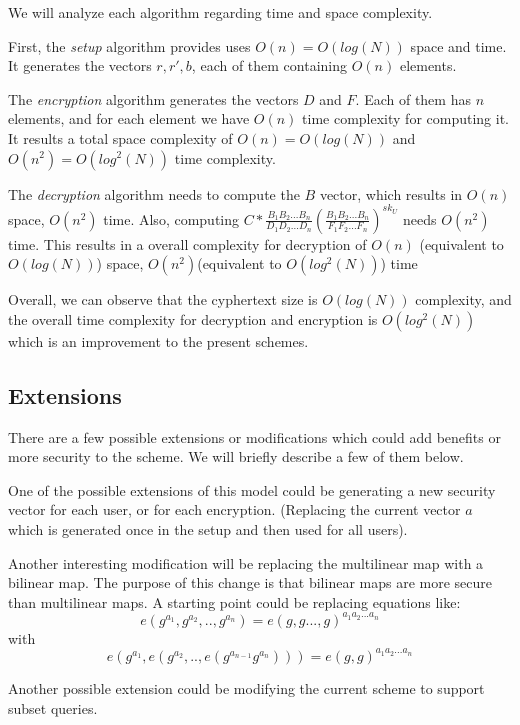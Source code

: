 \documentclass[a4paper, 12pt, oneside]{article}
\begin{document}
We will analyze each algorithm regarding time and space complexity.



First, the \textit{setup} algorithm provides uses $O(n) = O(log(N))$ space and time. It generates the vectors $r, r', b$, each of them containing $O(n)$ elements.

\bigskip
The \textit{encryption} algorithm generates the vectors $D$ and $F$. Each of them has $n$ elements, and for each element we have $O(n)$ time complexity for computing it. It results a total space complexity of $O(n) = O(log(N))$ and $O(n^2) = O(log^2(N))$ time complexity.

\bigskip
The \textit{decryption} algorithm needs to compute the $B$ vector, which results in $O(n)$ space, $O(n^2)$ time. Also, computing $C*\frac{B_1B_2...B_n}{D_1D_2...D_n}(\frac{B_1B_2...B_n}{F_1F_2...F_n})^{sk_U}$ needs $O(n^2)$ time. This results in a overall complexity for decryption of $O(n)$ (equivalent to $O(log(N))$) space, $O(n^2)$(equivalent to $O(log^2(N))$) time 

\bigskip
Overall, we can observe that the cyphertext size is $O(log(N))$ complexity, and the overall time complexity for decryption and encryption is $O(log^2(N))$ which is an improvement to the present schemes.


\subsection{Extensions}
There are a few possible extensions or modifications which could add benefits or more security to the scheme. We will briefly describe a few of them below.

\bigskip
One of the possible extensions of this model could be generating a new security vector for each user, or for each encryption. (Replacing the current vector $a$ which is generated once in the setup and then used for all users).

\bigskip
Another interesting modification will be replacing the multilinear map with a bilinear map. The purpose of this change is that bilinear maps are more secure than multilinear maps. A starting point could be replacing equations like: 
\[e(g^{a_1}, g^{a_2}, .., g^{a_n}) = e(g, g..., g)^{a_1a_2...a_n}\]
with 
\[e(g^{a_1}, e(g^{a_2}, ..,e(g^{a_{n-1}} g^{a_n})) ) = e(g, g)^{a_1a_2...a_n}\]

\bigskip
Another possible extension could be modifying the current scheme to support subset queries.

%
%
\end{document}
